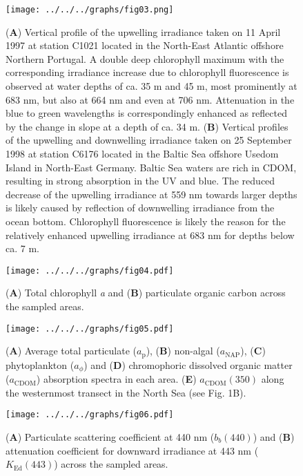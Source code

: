 \documentclass[essd, manuscript]{copernicus}
\begin{document}
\begin{figure}[t]
    \texttt{[image: ../../../graphs/fig03.png]}
    \caption{(\textbf{A}) Vertical profile of the upwelling irradiance taken on 11 April 1997 at station C1021 located in the North-East Atlantic offshore Northern Portugal. A double deep chlorophyll maximum with the corresponding irradiance increase due to chlorophyll fluorescence is observed at water depths of ca. 35 m and 45 m, most prominently at 683 nm, but also at 664 nm and even at 706 nm. Attenuation in the blue to green wavelengths is correspondingly enhanced as reflected by the change in slope at a depth of ca. 34 m. (\textbf{B}) Vertical profiles of the upwelling and downwelling irradiance taken on 25 September 1998 at station C6176 located in the Baltic Sea offshore Usedom Island in North-East Germany. Baltic Sea waters are rich in CDOM, resulting in strong absorption in the UV and blue. The reduced decrease of the upwelling irradiance at 559 nm towards larger depths is likely caused by reflection of downwelling irradiance from the ocean bottom. Chlorophyll fluorescence is likely the reason for the relatively enhanced upwelling irradiance at 683 nm for depths below ca. 7 m.}
\end{figure}

\clearpage

\begin{figure}[t]
    \texttt{[image: ../../../graphs/fig04.pdf]}
    \caption{(\textbf{A}) Total chlorophyll \textit{a} and (\textbf{B}) particulate organic carbon across the sampled areas.}
\end{figure}

\clearpage

\begin{figure}[t]
    \texttt{[image: ../../../graphs/fig05.pdf]}
    \caption{(\textbf{A}) Average total particulate ($a_\text{p}$), (\textbf{B}) non-algal ($a_\text{NAP}$), (\textbf{C}) phytoplankton ($a_{\phi}$) and (\textbf{D}) chromophoric dissolved organic matter ($a_\text{CDOM}$) absorption spectra in each area. (\textbf{E}) $a_\text{CDOM}(350)$ along the westernmost transect in the North Sea (see Fig. 1B).}
\end{figure}

\clearpage

\begin{figure}[t]
    \texttt{[image: ../../../graphs/fig06.pdf]}
    \caption{(\textbf{A}) Particulate scattering coefficient at 440 nm ($b_{b}(440)$) and (\textbf{B}) attenuation coefficient for downward irradiance at 443 nm ($K_{\text{Ed}}(443)$) across the sampled areas.}
\end{figure}
\end{document}
